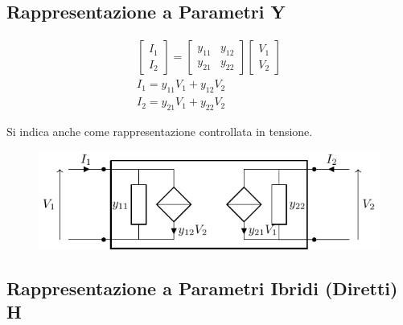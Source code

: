 \documentclass{article}
\numberwithin{equation}{subsection}
\begin{document}
\subsection{Rappresentazione a Parametri Y}

\begin{gather*}
    \begin{bmatrix}
        I_1\\I_2
    \end{bmatrix}=\begin{bmatrix}
        y_{11}&y_{12}\\y_{21}&y_{22}
    \end{bmatrix}\begin{bmatrix}
        V_1\\V_2
    \end{bmatrix}\\
    I_1=y_{11}V_1+y_{12}V_2\\
    I_2=y_{21}V_1+y_{22}V_2
\end{gather*}

Si indica anche come rappresentazione controllata in tensione. 

\begin{figure}[H]%
    \centering
    \includegraphics{rappresentazione-parametri-y.pdf}%
    \label{fig:rappresentazione-parametri-y}
\end{figure}

\subsection{Rappresentazione a Parametri Ibridi (Diretti) H}
\end{document}
